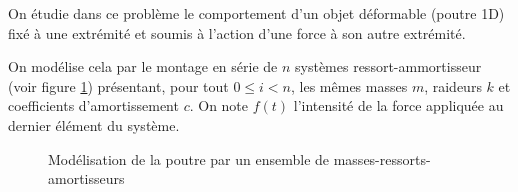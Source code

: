 
On étudie dans ce problème le comportement d'un objet déformable (poutre 1D) fixé à une extrémité et soumis à l'action d'une force à son autre extrémité. 

On modélise cela par le montage en série de $n$ systèmes ressort-ammortisseur (voir figure \ref{fig1}) présentant, pour tout $0 \leq i < n$, 
les mêmes masses  $m$, raideurs $k$ et coefficients d'amortissement $c$.
On note $f(t)$ l'intensité de la force appliquée au dernier élément du système. 


\begin{figure}[!htb]
\begin{center}
\iflivret

\else

\fi
\end{center}
\caption{Modélisation de la poutre par un ensemble de masses-ressorts-amortisseurs\label{fig1}}
\end{figure}



